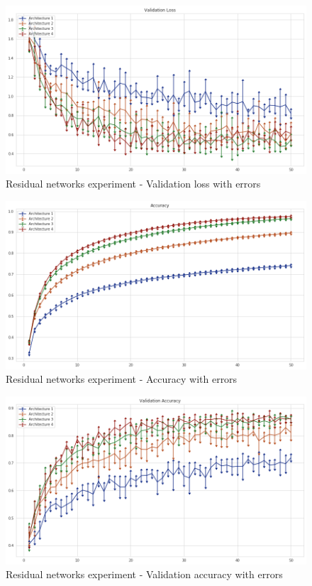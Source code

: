 \documentclass{article}
\begin{document}
\begin{figure}[!h]
  \includegraphics[width=1\linewidth]{resnet_experimentval_loss_errorbars.png}  
\caption{Residual networks experiment - Validation loss with errors}
\label{err2}
\end{figure}

\begin{figure}[!h]
  \includegraphics[width=1\linewidth]{resnet_experimentaccuracy_errorbars.png}  
\caption{Residual networks experiment - Accuracy with errors}
\label{err3}
\end{figure}

\begin{figure}[!h]
  \includegraphics[width=1\linewidth]{resnet_experimentval_accuracy_errorbars.png}
\caption{Residual networks experiment - Validation accuracy with errors}
\label{err4}
\end{figure}
\end{document}
